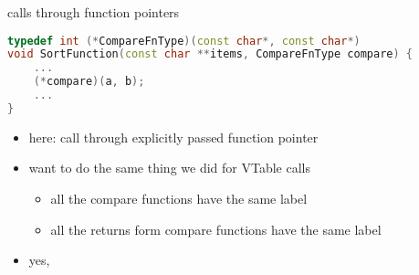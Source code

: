 \begin{frame}[fragile,label=checkIndirectSortIntro]{calls through function pointers}
\begin{lstlisting}[language=C++,style=small]
typedef int (*CompareFnType)(const char*, const char*)
void SortFunction(const char **items, CompareFnType compare) {
    ...
    (*compare)(a, b);
    ...
}
\end{lstlisting}
\begin{itemize}
\item here: call through explicitly passed function pointer
\item want to do the same thing we did for VTable calls
    \begin{itemize}
    \item all the compare functions have the same label
    \item all the returns form compare functions have the same label
    \end{itemize}
\vspace{.5cm}
\item yes, 
\end{itemize}
\end{frame}
